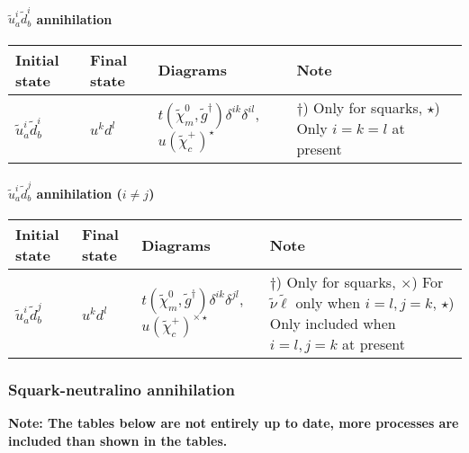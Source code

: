 \paragraph{$\tilde{u}_a^i \tilde{d}_{b}^{i}$ annihilation}

\begin{center}
\begin{tabular}{llll} \hline
{\bfseries Initial state} & {\bfseries Final state} &
{\bfseries Diagrams} & {\bfseries Note} \\ \hline \tabspace
$\tilde{u}^i_a \tilde{d}^{i}_b$ & $u^k d^l$ &
$t(\tilde{\chi}_m^0,\tilde{g}^\dagger)\delta^{ik}\delta^{il}$, $u(\tilde{\chi}_c^+)^\star$ 
& \parbox[t]{4cm}{$\dagger$) Only for squarks, $\star$) Only $i=k=l$ at present} \\ \hline
\end{tabular}
\end{center}

\paragraph{$\tilde{u}_a^i \tilde{d}_{b}^{j}$ annihilation ($i \ne j$)}

\begin{center}
\begin{tabular}{llll} \hline
{\bfseries Initial state} & {\bfseries Final state} &
{\bfseries Diagrams} & {\bfseries Note} \\ \hline \tabspace
$\tilde{u}^i_a \tilde{d}^{j}_b$ & $u^k d^l$ &
$t(\tilde{\chi}_m^0,\tilde{g}^\dagger)\delta^{ik}\delta^{jl}$, $u(\tilde{\chi}_c^+)^{\times\star}$ 
& \parbox[t]{4cm}{$\dagger$) Only for squarks, $\times$) For $\tilde{\nu}\tilde{\ell}$ only when $i=l,j=k$,
$\star$) Only included when $i=l,j=k$ at present} \\ \hline
\end{tabular}
\end{center}


\subsubsection{Squark-neutralino annihilation}

{\bfseries Note: The tables below are not entirely up to date, more processes are included
than shown in the tables.}

